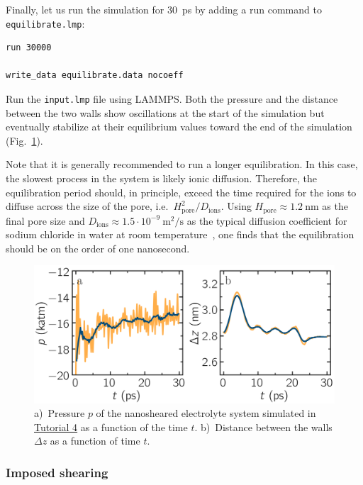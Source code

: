 \documentclass[9pt,tutorial]{livecoms}
\newcommand{\lmpcmd}[1]{\hspace{0pt}\colorbox{listing}{\textcolor{command}{\small{#1}}}\hspace{0pt}} %
\newcommand{\flecmd}[1]{\textcolor{command}{\texttt{#1}}} %
\begin{document}
Finally, let us run the simulation for 30~ps by adding a \lmpcmd{run} command
to \flecmd{equilibrate.lmp}:
\begin{lstlisting}
run 30000

write_data equilibrate.data nocoeff
\end{lstlisting}
Run the \flecmd{input.lmp} file using LAMMPS.  Both the pressure and the distance
between the two walls show oscillations at the start of the simulation
but eventually stabilize at their equilibrium values toward
the end of the simulation (Fig.~\ref{fig:NANOSHEAR-equilibration}).

\begin{note}
Note that it is generally recommended to run a longer equilibration.  In this case,
the slowest process in the system is likely ionic diffusion.
Therefore, the equilibration period should, in principle, exceed the time required
for the ions to diffuse across the size of the pore, i.e.~$H_\text{pore}^2/D_\text{ions}$.
Using $H_\text{pore} \approx 1.2~\text{nm}$ as the final pore size
and $D_\text{ions} \approx 1.5 \cdot 10^{-9}~\text{m}^2/\text{s}$
as the typical diffusion coefficient for sodium chloride in water at room
temperature~\cite{mills1955remeasurement}, one finds that the equilibration
should be on the order of one nanosecond.
\end{note}

\begin{figure}
\centering
\includegraphics[width=\linewidth]{NANOSHEAR-equilibration}
\caption{a)~Pressure $p$ of the nanosheared electrolyte system
simulated in \hyperref[sheared-confined-label]{Tutorial 4} as a function of the
time $t$.  b)~Distance between the walls $\Delta z$ as a function of time $t$.}
\label{fig:NANOSHEAR-equilibration}
\end{figure}

\subsubsection{Imposed shearing}
\end{document}
